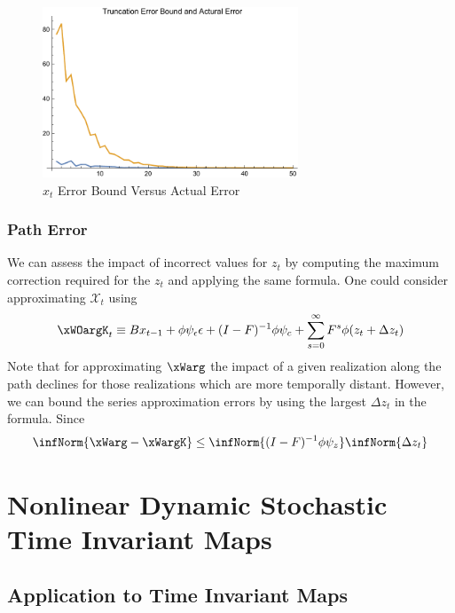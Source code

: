 \documentclass[12pt]{article}
\begin{document}
\begin{figure}
  \centering


\includegraphics[width=3in]{arbTruncErr.pdf}  
  \caption{$x_t$ Error Bound Versus Actual Error} \label{figArbTrunc}

\end{figure}

\subsubsection{Path Error}


We can assess the impact of incorrect values for $z_t$ by computing the maximum correction required for the $z_t$ and applying the 
same formula.
One could consider approximating $\mathcal{X}_t$ using
 	 \begin{gather}
 	 \xWOargK_t \equiv B x_{t-1}+ \phi \psi_\epsilon\epsilon  + (I - F)^{-1} \phi \psi_c + \sum_{s=0}^\infty F^s \phi (z_{t}+\Delta z_{t})\label{theDeltaSeries}
 \end{gather}
Note that for approximating $\xWarg$ the impact of  a given realization along the path declines for those realizations which are  more temporally distant.
However, we can bound the  series approximation  errors by using the largest $\Delta z_t$ in the formula. 
Since
    \begin{gather}
\infNorm{\xWarg-\xWargK} \le \infNorm{(I -F)^{-1} \phi \psi_z}  \infNorm{\Delta z_t } \label{pathErr}
    \end{gather}


\label{sec:pathnorm}

\section{Nonlinear Dynamic Stochastic Time Invariant Maps}
\label{sec:extToMaps}



\subsection{Application to Time Invariant Maps}
\end{document}
